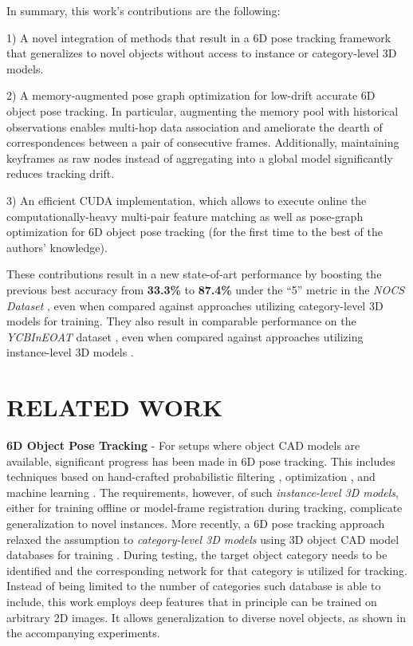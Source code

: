 \documentclass[letterpaper, 10 pt, conference]{ieeeconf}
\begin{document}
In summary, this work's contributions are the following:





1) A novel integration of methods that result in a 6D pose tracking framework that generalizes to novel objects without access to instance or category-level 3D models.

2) A memory-augmented pose graph optimization for low-drift accurate 6D object pose tracking. In particular, augmenting the memory pool with historical observations enables multi-hop data association and ameliorate the dearth of correspondences between a pair of consecutive frames. Additionally, maintaining keyframes as raw nodes instead of aggregating into a global model significantly reduces tracking drift.

3) An efficient CUDA implementation, which allows to execute online the computationally-heavy multi-pair feature matching as well as pose-graph optimization for 6D object pose tracking (for the first time to the best of the authors' knowledge). 

These contributions result in a new state-of-art performance by boosting the previous best accuracy from \textbf{33.3\%} to \textbf{87.4\%} under the ``5'' metric in the \textit{NOCS Dataset} \cite{Wang_2019_CVPR}, even when compared against approaches utilizing category-level 3D models for training.  They also result in comparable performance on the \textit{YCBInEOAT} dataset \cite{wense3tracknet}, even when compared against approaches utilizing instance-level 3D models \cite{wense3tracknet}.

 


\section{RELATED WORK}
\textbf{6D Object Pose Tracking} - For setups where object CAD 
models are available, significant progress has been made in 6D pose tracking. This includes techniques based on hand-crafted probabilistic filtering \cite{choi2013rgb,Wthrich2013ProbabilisticOT,issac2016depth}, optimization \cite{schmidt2014dart, joseph2015versatile, zhong2019robust, tjaden2018region}, and machine learning \cite{deng2019poserbpf,wense3tracknet}. The requirements, however, of such \textit{instance-level 3D models}, either for training offline or model-frame registration during tracking, complicate generalization to novel instances. More recently,  a 6D pose tracking approach \cite{wang20196-pack} relaxed the assumption to \textit{category-level 3D models} using 3D object CAD model databases for training \cite{chang2015shapenet}. During testing, the target object category needs to be identified and the corresponding network for that category is utilized for tracking. Instead of being limited to the number of categories such database is able to include, this work employs deep features that in principle can be trained on arbitrary 2D images. It allows generalization to diverse novel objects, as shown in the accompanying experiments. 
\end{document}
